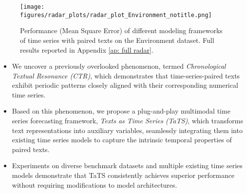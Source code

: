 \begin{figure}[t]
    \centering
    \texttt{[image: figures/radar\_plots/radar\_plot\_Environment\_notitle.png]}
    \caption{Performance (Mean Square Error) of different modeling frameworks of time series with paired texts on the Environment dataset. Full results reported in Appendix \ref{ap: full radar}.}
    \label{fig: main radar}
    \vspace{-2mm}
\end{figure}

\begin{itemize}
\vspace{-3mm}
    \item We uncover a previously overlooked phenomenon, termed \textit{Chronological Textual Resonance (CTR)}, which demonstrates that time-series-paired texts exhibit periodic patterns closely aligned with their corresponding numerical time series.
    \item Based on this phenomenon, we propose a plug-and-play multimodal time series forecasting framework, \textit{Texts as Time Series (TaTS)}, which transforms text representations into auxiliary variables, seamlessly integrating them into existing time series models to capture the intrinsic temporal properties of paired texts.
    \item Experiments on diverse benchmark datasets and multiple existing time series models demonstrate that TaTS consistently achieves superior performance without requiring modifications to model architectures.
\end{itemize}